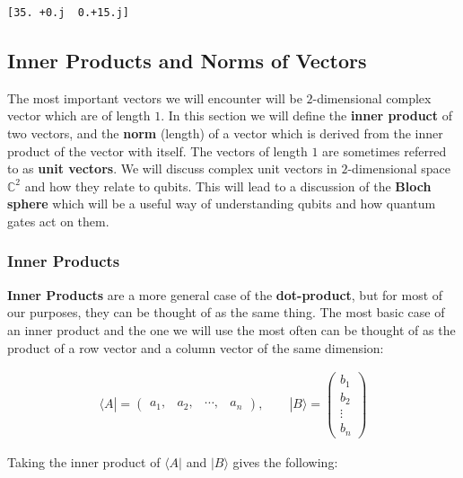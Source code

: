 \documentclass[11pt]{article}
\begin{document}
    \begin{Verbatim}[commandchars=\\\{\}]
[35. +0.j  0.+15.j]
\end{Verbatim}

    \hypertarget{inner-products-and-norms-of-vectors}{%
\subsection{Inner Products and Norms of
Vectors}\label{inner-products-and-norms-of-vectors}}

The most important vectors we will encounter will be \(2\)-dimensional
complex vector which are of length \(1\). In this section we will define
the \textbf{inner product} of two vectors, and the \textbf{norm}
(length) of a vector which is derived from the inner product of the
vector with itself. The vectors of length \(1\) are sometimes referred
to as \textbf{unit vectors}. We will discuss complex unit vectors in
\(2\)-dimensional space \(\mathbb{C}^2\) and how they relate to qubits.
This will lead to a discussion of the \textbf{Bloch sphere} which will
be a useful way of understanding qubits and how quantum gates act on
them.

\hypertarget{inner-products}{%
\subsubsection{Inner Products}\label{inner-products}}

\textbf{Inner Products} are a more general case of the
\textbf{dot-product}, but for most of our purposes, they can be thought
of as the same thing. The most basic case of an inner product and the
one we will use the most often can be thought of as the product of a row
vector and a column vector of the same dimension:

\begin{align} \langle A| = \begin{pmatrix}
a_1, & a_2, & \cdots, & a_n
\end{pmatrix}, \quad \quad
|B\rangle = \begin{pmatrix}
b_1 \\ b_2 \\ \vdots \\ b_n
\end{pmatrix} \end{align}

Taking the inner product of \(\langle A|\) and \(|B\rangle\) gives the
following:
\end{document}

